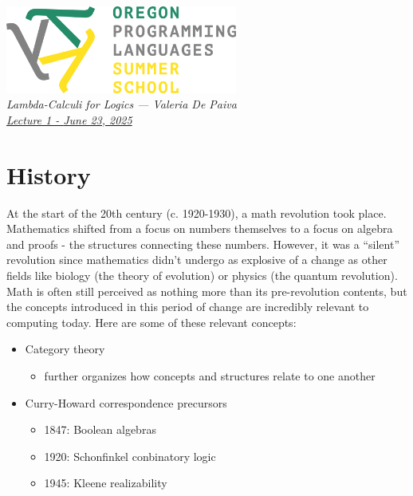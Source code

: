 \documentclass[11pt]{article}
\begin{document}
\thispagestyle{plain}
\begin{center}
\includegraphics[width=3in]{oplssLogo.png}\\[2\parskip]
\sffamily \LARGE \slshape Lambda-Calculi for Logics
--- \upshape Valeria De Paiva \\[2ex]
\href{https://github.com/vcvpaiva/DialecticaCategories/blob/master/OPLSS2025/OregonLecture1.pdf}{\large Lecture 1 - \slshape June 23, 2025}
\end{center}

\section{History}
At the start of the 20th century (c. 1920-1930), a math revolution took place. Mathematics shifted from a focus on numbers themselves to a focus on algebra and proofs - the structures connecting these numbers. However, it was a ``silent'' revolution since mathematics didn't undergo as explosive of a change as other fields like biology (the theory of evolution) or physics (the quantum revolution). Math is often still perceived as nothing more than its pre-revolution contents, but the concepts introduced in this period of change are incredibly relevant to computing today. Here are some of these relevant concepts:
\begin{itemize}
    \item Category theory 
        \begin{itemize}
            \item further organizes how concepts and structures relate to one another
        \end{itemize}
    \item Curry-Howard correspondence precursors
        \begin{itemize}
            \item 1847: Boolean algebras
            \item 1920: Schonfinkel conbinatory logic
            \item 1945: Kleene realizability
        \end{itemize}
\end{itemize}
\begin{center}
\end{center}
\end{document}

